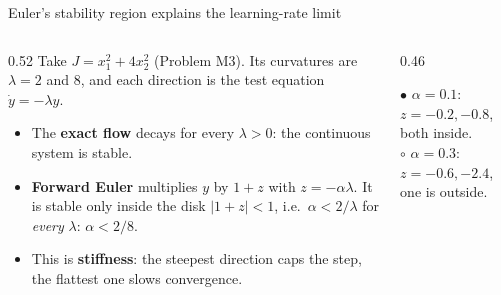 \begin{frame}{Euler's stability region explains the learning-rate limit}
  \begin{columns}[T]
    \begin{column}{0.52\textwidth}
      \small
      Take $J = x_1^2 + 4x_2^2$ (Problem M3). Its curvatures are $\lambda = 2$ and $8$, and each direction
      is the test equation $\dot y = -\lambda y$.
      \begin{itemize}\footnotesize
        \item The \textbf{exact flow} decays for every $\lambda > 0$: the continuous system is stable.
        \item \textbf{Forward Euler} multiplies $y$ by $1 + z$ with $z = -\alpha\lambda$. It is stable only inside the disk
              $|1 + z| < 1$, i.e.\ $\alpha < 2/\lambda$ for \emph{every} $\lambda$: $\alpha < 2/8$.
        \item This is \textbf{stiffness}: the steepest direction caps the step, the flattest one slows convergence.
      \end{itemize}
    \end{column}
    \begin{column}{0.46\textwidth}
      \centering
      

      \footnotesize
      \textcolor{mBlue}{$\bullet$} $\alpha = 0.1$: $z = -0.2, -0.8$, both inside.\\
      \textcolor{mRed}{$\circ$} $\alpha = 0.3$: $z = -0.6, -2.4$, one is outside.
    \end{column}
  \end{columns}
\end{frame}


